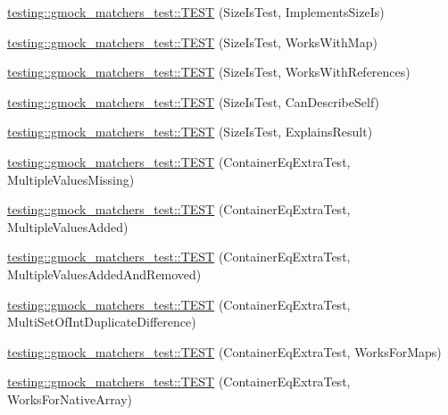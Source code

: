 \begin{DoxyCompactItemize}
\item 
\hyperlink{namespacetesting_1_1gmock__matchers__test_abe619d5d1910e1f2e8b169622d1d8592}{testing\+::gmock\+\_\+matchers\+\_\+test\+::\+T\+E\+ST} (Size\+Is\+Test, Implements\+Size\+Is)
\item 
\hyperlink{namespacetesting_1_1gmock__matchers__test_aea77169d6c56b88b5c99273d5a2bc0f2}{testing\+::gmock\+\_\+matchers\+\_\+test\+::\+T\+E\+ST} (Size\+Is\+Test, Works\+With\+Map)
\item 
\hyperlink{namespacetesting_1_1gmock__matchers__test_a53bcd375786f69d889a8e8891ff8e0b0}{testing\+::gmock\+\_\+matchers\+\_\+test\+::\+T\+E\+ST} (Size\+Is\+Test, Works\+With\+References)
\item 
\hyperlink{namespacetesting_1_1gmock__matchers__test_adc9720306de1626aa7e523637ca64dfa}{testing\+::gmock\+\_\+matchers\+\_\+test\+::\+T\+E\+ST} (Size\+Is\+Test, Can\+Describe\+Self)
\item 
\hyperlink{namespacetesting_1_1gmock__matchers__test_a6c218845fd345302c490ef53f0d36995}{testing\+::gmock\+\_\+matchers\+\_\+test\+::\+T\+E\+ST} (Size\+Is\+Test, Explains\+Result)
\item 
\hyperlink{namespacetesting_1_1gmock__matchers__test_ab84ac6cfde20f21ed69d5d7aa882ea1b}{testing\+::gmock\+\_\+matchers\+\_\+test\+::\+T\+E\+ST} (Container\+Eq\+Extra\+Test, Multiple\+Values\+Missing)
\item 
\hyperlink{namespacetesting_1_1gmock__matchers__test_acc28beb0f3d3fbd8923bad7eb08ce6a6}{testing\+::gmock\+\_\+matchers\+\_\+test\+::\+T\+E\+ST} (Container\+Eq\+Extra\+Test, Multiple\+Values\+Added)
\item 
\hyperlink{namespacetesting_1_1gmock__matchers__test_acb0d845f828c2d5a551e4db0611f2853}{testing\+::gmock\+\_\+matchers\+\_\+test\+::\+T\+E\+ST} (Container\+Eq\+Extra\+Test, Multiple\+Values\+Added\+And\+Removed)
\item 
\hyperlink{namespacetesting_1_1gmock__matchers__test_a6bce9564bb713ffb690b776e35d2e6cf}{testing\+::gmock\+\_\+matchers\+\_\+test\+::\+T\+E\+ST} (Container\+Eq\+Extra\+Test, Multi\+Set\+Of\+Int\+Duplicate\+Difference)
\item 
\hyperlink{namespacetesting_1_1gmock__matchers__test_ab7bcbeeeb23094cff6f2882304c05134}{testing\+::gmock\+\_\+matchers\+\_\+test\+::\+T\+E\+ST} (Container\+Eq\+Extra\+Test, Works\+For\+Maps)
\item 
\hyperlink{namespacetesting_1_1gmock__matchers__test_ae5e5420340c8cf91d24af11feca669b0}{testing\+::gmock\+\_\+matchers\+\_\+test\+::\+T\+E\+ST} (Container\+Eq\+Extra\+Test, Works\+For\+Native\+Array)

\end{DoxyCompactItemize}
